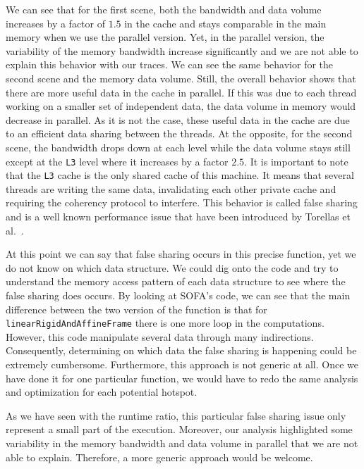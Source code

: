 We can see that for the first scene, both the bandwidth and data volume increases by a factor of $1.5$ in the cache and stays comparable in the main memory when we use the parallel version.
Yet, in the parallel version, the variability of the memory bandwidth increase significantly
and we are not able to explain this behavior with our traces.
We can see the same behavior for the second scene and the memory data volume.
Still, the overall behavior shows that there are more useful data in the cache in parallel.
If this was due to each thread working on a smaller set of independent data, the data volume in memory would decrease in parallel.
As it is not the case, these useful data in the cache are due to an efficient data sharing between the threads.
At the opposite, for the second scene, the bandwidth drops down at each level while the data volume stays still except at the \texttt{L3} level where it increases by a factor $2.5$.
It is important to note that the \texttt{L3} cache is the only shared cache of this machine.
It means that several threads are writing the same data, invalidating each other private cache and requiring the coherency protocol to interfere.
This behavior is called false sharing and is a well known performance issue that have been introduced by Torellas et al.~\cite{Torrellas94False}.

At this point we can say that false sharing occurs in this precise function, yet we do not know on which data structure.
We could dig onto the code and try to understand the memory access pattern of each data structure to see where the false sharing does occurs.
By looking at \gls{SOFA}'s code, we can see that the main difference between the two version of the function is that for \texttt{linearRigidAndAffineFrame} there is one more loop in the computations.
However, this code manipulate several data through many indirections.
Consequently, determining on which data the false sharing is happening could be extremely cumbersome.
Furthermore, this approach is not generic at all.
Once we have done it for one particular function, we would have to redo the same analysis and optimization for each potential hotspot.

As we have seen with the runtime ratio, this particular false sharing issue only represent a small part of the execution.
Moreover, our analysis highlighted some variability in the memory bandwidth and data volume in parallel that we are not able to explain.
Therefore, a more generic approach would be welcome.

